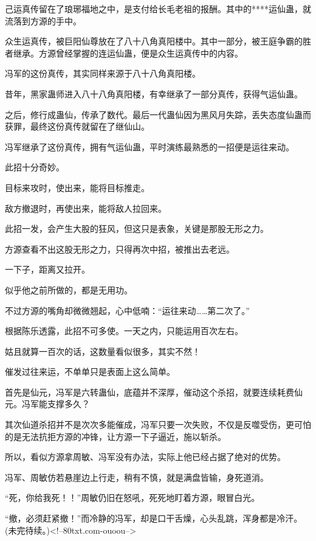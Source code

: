\begin{this_body}
己运真传留在了琅琊福地之中，是支付给长毛老祖的报酬。其中的****运仙蛊，就流落到方源的手中。

众生运真传，被巨阳仙尊放在了八十八角真阳楼中。其中一部分，被王庭争霸的胜者继承。方源曾经掌握的连运仙蛊，便是众生运真传中的内容。

冯军的这份真传，其实同样来源于八十八角真阳楼。

昔年，黑家蛊师进入八十八角真阳楼，有幸继承了一部分真传，获得气运仙蛊。

之后，修行成蛊仙，传承了数代。最后一代蛊仙因为黑风月失踪，丢失态度仙蛊而获罪，最终这份真传就留在了继仙山。

冯军继承了这份真传，拥有气运仙蛊，平时演练最熟悉的一招便是运往来动。

此招十分奇妙。

目标来攻时，使出来，能将目标推走。

敌方撤退时，再使出来，能将敌人拉回来。

此招一发，会产生大股的狂风，但这只是表象，关键是那股无形之力。

方源查看不出这股无形之力，只得再次中招，被推出去老远。

一下子，距离又拉开。

似乎他之前所做的，都是无用功。

不过方源的嘴角却微微翘起，心中低喃：“运往来动……第二次了。”

根据陈乐透露，此招不可多使。一天之内，只能运用百次左右。

姑且就算一百次的话，这数量看似很多，其实不然！

催发过往来运，不单单只是表面上这么简单。

首先是仙元，冯军是六转蛊仙，底蕴并不深厚，催动这个杀招，就要连续耗费仙元。冯军能支撑多久？

其次仙道杀招并不是次次多能催成，冯军只要一次失败，不仅是反噬受伤，更可怕的是无法抗拒方源的冲锋，让方源一下子逼近，施以斩杀。

所以，看似方源拿周敏、冯军没有办法，实际上他已经占据了绝对的优势。

冯军、周敏仿若悬崖边上行走，稍有不慎，就是满盘皆输，身死道消。

“死，你给我死！！”周敏仍旧在怒吼，死死地盯着方源，眼冒白光。

“撤，必须赶紧撤！”而冷静的冯军，却是口干舌燥，心头乱跳，浑身都是冷汗。(未完待续。)<!--80txt.com-ouoou-->

\end{this_body}

